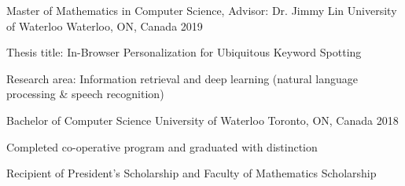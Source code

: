 


\begin{cventries}



\cventry
{Master of Mathematics in Computer Science, Advisor: Dr. Jimmy Lin} %
{University of Waterloo} %
{Waterloo, ON, Canada} %
{2019} %
{ %
\begin{cvitems}
\item {Thesis title: In-Browser Personalization for Ubiquitous Keyword Spotting}
\item {Research area: Information retrieval and deep learning (natural language processing \& speech recognition)}
\end{cvitems}
}
\cventry
{Bachelor of Computer Science} %
{University of Waterloo} %
{Toronto, ON, Canada} %
{2018} %
{ %
\begin{cvitems}
\item {Completed co-operative program and graduated with distinction}
\item {Recipient of President's Scholarship and Faculty of Mathematics Scholarship}
\end{cvitems}
}

\end{cventries}
\vspace*{-0.25cm}